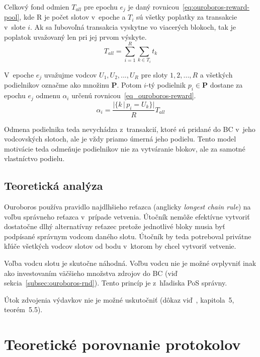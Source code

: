 Celkový fond odmien $T_{all}$ pre epochu $e_j$ je daný rovnicou~\ref{eq:ouroboros-reward-pool}, kde R je počet slotov v~epoche a $T_i$ sú všetky poplatky za transakcie v~slote $i$. Ak sa ľubovoľná transakcia vyskytne vo viacerých blokoch, tak je poplatok uvažovaný len pri jej prvom výskyte.
\begin{equation}\label{eq:ouroboros-reward-pool}
	T_{all} = \sum_{i=1}^{R}\sum_{k \in T_i}t_k
\end{equation}

V~epoche $e_j$ uvažujme vodcov $U_1, U_2, ..., U_R$ pre sloty $1, 2, ..., R$ a všetkých podielnikov označme ako množinu $\mathbf{P}$. Potom $i$-tý podielnik $p_i \in \mathbf{P}$ dostane za epochu $e_j$ odmenu $\alpha_i$ určenú rovnicou~\ref{eq_ouroboros-reward}.
\begin{equation}\label{eq_ouroboros-reward}
	\alpha_i = \frac{|\{ k\,|\,p_i = U_k \}|}{R}T_{all}
\end{equation}

Odmena podielnika teda nevychádza z~transakcií, ktoré sú pridané do BC v~jeho vodcovských slotoch, ale je vždy priamo úmerná jeho podielu. Tento model motivácie teda odmeňuje podielnikov nie za vytváranie blokov, ale za samotné vlastníctvo podielu.

\section{Teoretická analýza}

Ouroboros používa pravidlo najdlhšieho reťazca (anglicky \textit{longest chain rule}) na voľbu správneho reťazca v~prípade vetvenia. Útočník nemôže efektívne vytvoriť dostatočne dlhý alternatívny reťazec pretože jednotlivé bloky musia byť podpísané správnym vodcom daného slotu. Útočník by teda potreboval privátne kľúče všetkých vodcov slotov od bodu v~ktorom by chcel vytvoriť vetvenie.

Voľba vodcu slotu je skutočne náhodná. Voľbu vodcu nie je možné ovplyvniť inak ako investovaním väčšieho množstva zdrojov do BC (viď sekcia~\ref{subsec:ouroboros-rnd}). Tento princíp je z~hľadiska PoS správny.

Útok zdvojenia výdavkov nie je možné uskutočniť (dôkaz viď~\cite{ouroborosWp}, kapitola~5, teorém~5.5).

\chapter{Teoretické porovnanie protokolov}\label{chap:protocol-comparison}

